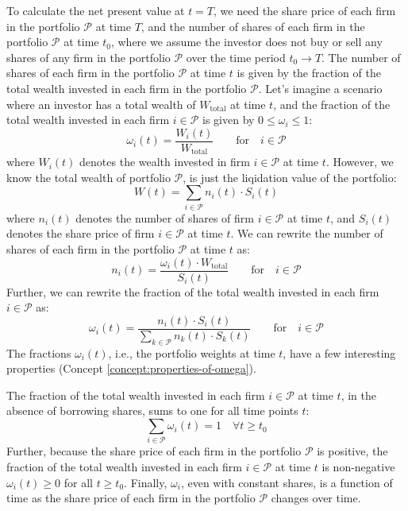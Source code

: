 \documentclass[11pt]{article}
\theoremstyle{definition}
\begin{document}
To calculate the net present value at $t=T$, we need the share price of each firm in the portfolio $\mathcal{P}$ at time $T$, and the number of shares of each firm in the portfolio $\mathcal{P}$ at time $t_{0}$, 
where we assume the investor does not buy or sell any shares of any firm in the portfolio $\mathcal{P}$ over the time period $t_{0}\rightarrow{T}$. The number of shares of each firm in the portfolio $\mathcal{P}$ at time $t$ is given by the fraction of the total wealth invested in each firm in the portfolio $\mathcal{P}$. Let's imagine a scenario where an investor has a total wealth of $W_{\text{total}}$ at time $t$, and the fraction of the total wealth invested in each firm $i\in\mathcal{P}$ is given by $0\leq{\omega_{i}}\leq{1}$:
\begin{equation*}
\omega_{i}(t) = \frac{W_{i}(t)}{W_{\text{total}}}\qquad\text{for}\quad{i\in\mathcal{P}}
\end{equation*}
where $W_{i}(t)$ denotes the wealth invested in firm $i\in\mathcal{P}$ at time $t$.
However, we know the total wealth of portfolio $\mathcal{P}$, is just the liqidation value of the portfolio: 
\begin{equation*}
W(t) = \sum_{i\in\mathcal{P}}n_{i}(t)\cdot{S_{i}(t)}
\end{equation*}
where $n_{i}(t)$ denotes the number of shares of firm $i\in\mathcal{P}$ at time $t$, and $S_{i}(t)$ denotes the share price of firm $i\in\mathcal{P}$ at time $t$. We can rewrite the number of shares of each firm in the portfolio $\mathcal{P}$ at time $t$ as:
\begin{equation*}
	n_{i}(t) = \frac{\omega_{i}(t)\cdot{W_{\text{total}}}}{S_{i}(t)}\qquad\text{for}\quad{i\in\mathcal{P}}
\end{equation*}
Further, we can rewrite the fraction of the total wealth invested in each firm $i\in\mathcal{P}$ as:
\begin{equation}\label{eqn:portfolio-weights-derivation}
\omega_{i}(t) = \frac{n_{i}(t)\cdot{S_{i}(t)}}{\displaystyle\sum_{k\in\mathcal{P}}n_{k}(t)\cdot{S}_{k}(t)}\qquad\text{for}\quad{i\in\mathcal{P}}
\end{equation}
The fractions $\omega_{i}(t)$, i.e., the portfolio weights at time $t$, have a few interesting properties (Concept \ref{concept:properties-of-omega}).

\begin{concept}\label{concept:properties-of-omega}
The fraction of the total wealth invested in each firm $i\in\mathcal{P}$ at time $t$, in the absence of borrowing shares, sums to one for all time points $t$:
\begin{equation*}
\sum_{i\in\mathcal{P}}\omega_{i}(t) = 1\quad\forall{t\geq{t_{0}}}
\end{equation*}
Further, because the share price of each firm in the portfolio $\mathcal{P}$ is positive, the fraction of the total wealth invested in each firm $i\in\mathcal{P}$ at time $t$ is non-negative $\omega_{i}(t)\geq{0}$ for all $t\geq{t_{0}}$. 
Finally, $\omega_{i}$, even with constant shares, is a function of time as the share price of each firm in the portfolio $\mathcal{P}$ changes over time.
\end{concept}
\end{document}
